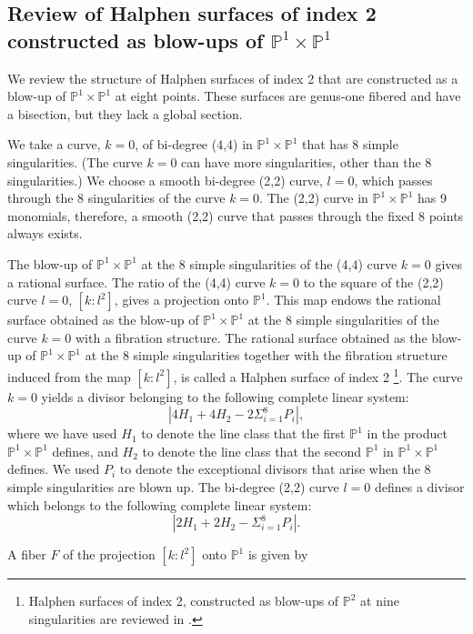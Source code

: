 \documentclass[12pt]{article}
\def\P{\mathbb{P}}
\begin{document}
\subsection{Review of Halphen surfaces of index 2 constructed as blow-ups of $\P^1\times\P^1$}
\label{ssec 2.1}
We review the structure of Halphen surfaces of index 2 that are constructed as a blow-up of $\P^1\times\P^1$ at eight points. These surfaces are genus-one fibered and have a bisection, but they lack a global section. 
\par We take a curve, $k=0$, of bi-degree (4,4) in $\P^1\times\P^1$ that has 8 simple singularities. (The curve $k=0$ can have more singularities, other than the 8 singularities.) We choose a smooth bi-degree (2,2) curve, $l=0$, which passes through the 8 singularities of the curve $k=0$. The (2,2) curve in $\P^1\times\P^1$ has 9 monomials, therefore, a smooth (2,2) curve that passes through the fixed 8 points always exists. 
\par The blow-up of $\P^1\times\P^1$ at the 8 simple singularities of the (4,4) curve $k=0$ gives a rational surface. The ratio of the (4,4) curve $k=0$ to the square of the (2,2) curve $l=0$, $[k:l^2]$, gives a projection onto $\P^1$. This map endows the rational surface obtained as the blow-up of $\P^1\times\P^1$ at the 8 simple singularities of the curve $k=0$ with a fibration structure. The rational surface obtained as the blow-up of $\P^1\times\P^1$ at the 8 simple singularities together with the fibration structure induced from the map $[k:l^2]$, is called a Halphen surface of index 2 \footnote{Halphen surfaces of index 2, constructed as blow-ups of $\P^2$ at nine singularities are reviewed in \cite{Kimura1801}.}.
The curve $k=0$ yields a divisor belonging to the following complete linear system:
\begin{equation}
|4H_1+4H_2-2\Sigma^8_{i=1} P_i|,
\end{equation}
where we have used $H_1$ to denote the line class that the first $\P^1$ in the product $\P^1\times\P^1$ defines, and $H_2$ to denote the line class that the second $\P^1$ in $\P^1\times\P^1$ defines. We used $P_i$ to denote the exceptional divisors that arise when the 8 simple singularities are blown up. The bi-degree (2,2) curve $l=0$ defines a divisor which belongs to the following complete linear system:
\begin{equation}
|2H_1+2H_2-\Sigma_{i=1}^8 P_i|.
\end{equation}
\par A fiber $F$ of the projection $[k:l^2]$ onto $\P^1$ is given by
\end{document}
